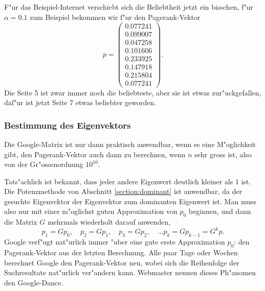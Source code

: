 F"ur das Beispiel-Internet verschiebt sich die Beliebtheit jetzt ein bisschen,
f"ur $\alpha = 0.1$ zum Beispiel bekommen wir f"ur den Pagerank-Vektor
\[
p=\begin{pmatrix}
   0.077241\\
   0.099007\\
   0.047258\\
   0.101606\\
   0.233925\\
   0.147918\\
   0.215804\\
   0.077241
\end{pmatrix}.
\]
Die Seite 5 ist zwar immer noch die beliebteste, aber sie ist etwas zur"uckgefallen,
daf"ur ist jetzt Seite 7 etwas beliebter geworden.

\subsubsection{Bestimmung des Eigenvektors}
Die Google-Matrix ist nur dann praktisch anwendbar, wenn es eine
M"oglichkeit gibt, den Pagerank-Vektor auch dann zu berechnen, wenn $n$
sehr gross ist, also von der Gr"ossenordnung $10^{10}$.

Tats"achlich ist bekannt, dass jeder andere Eigenwert deutlich kleiner als $1$
ist.
Die Potenzmethode von Abschnitt \ref{section:dominant} ist anwendbar,
da der gesuchte Eigenvektor der Eigenvektor zum dominanten Eigenwert
ist.
Man muss also nur mit einer m"oglichst guten Approximation von $p_0$ beginnen,
und dann die Matrix $G$ mehrmals wiederholt darauf anwenden, 
\[
p_1=Gp_0,\quad
p_2=Gp_1,\quad
p_3=Gp_2,\quad\dots p_k=Gp_{k-1}=G^kp.
\]
Google verf"ugt nat"urlich immer "uber eine gute erste Approximation $p_0$:
den Pagerank-Vektor aus der letzten Berechnung.
Alle paar Tage oder Wochen berechnet Google den Pagerank-Vektor neu,
wobei sich die Reihenfolge der Suchresultate nat"urlich ver"andern
kann. Webmaster nennen dieses Ph"anomen den Google-Dance. 

